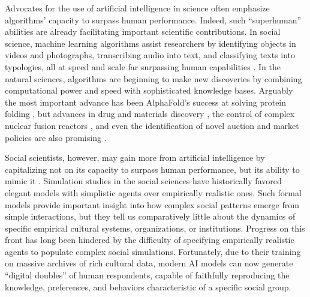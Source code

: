 \documentclass{article}
\begin{document}
Advocates for the use of artificial intelligence in science often
emphasize algorithms' capacity to surpass human performance. Indeed,
such ``superhuman'' abilities are already facilitating important
scientific contributions. In social science, machine learning algorithms
assist researchers by identifying objects in videos and photographs,
transcribing audio into text, and classifying texts into typologies, all
at speed and scale far surpassing human capabilities
\parencite{Bonikowski2022-th, Grimmer2022-fu, Hannan2022-bs, Le_Mens2023-wa, Vicinanza_undated-cj}. In the
natural sciences, algorithms are beginning to make new discoveries by
combining computational power and speed with sophisticated knowledge
bases. Arguably the most important advance has been AlphaFold's success
at solving protein folding \parencite{Senior2020-ee}, but advances in drug \parencite{Jimenez-Luna2020-tg} and materials discovery
\parencite{Wilkins2023-mx, Zhou2018-cw}, the control of complex nuclear fusion reactors
\parencite{Degrave2022-zi}, and
even the identification of novel auction and market policies are also
promising \parencite{Jiao2021-mb, Mosavi2020-hy}.

Social scientists, however, may gain more from artificial intelligence
by capitalizing not on its capacity to surpass human performance, but
its ability to mimic it
\parencite{Brynjolfsson2023-yu, Sourati2023-aa}. Simulation studies in the social sciences have
historically favored elegant models with simplistic agents over
empirically realistic ones. Such formal models provide important insight
into how complex social patterns emerge from simple interactions, but
they tell us comparatively little about the dynamics of specific
empirical cultural systems, organizations, or institutions. Progress on
this front has long been hindered by the difficulty of specifying
empirically realistic agents to populate complex social simulations.
Fortunately, due to their training on massive archives of rich cultural
data, modern AI models can now generate ``digital doubles'' of human
respondents, capable of faithfully reproducing the knowledge,
preferences, and behaviors characteristic of a specific social group.
\end{document}
